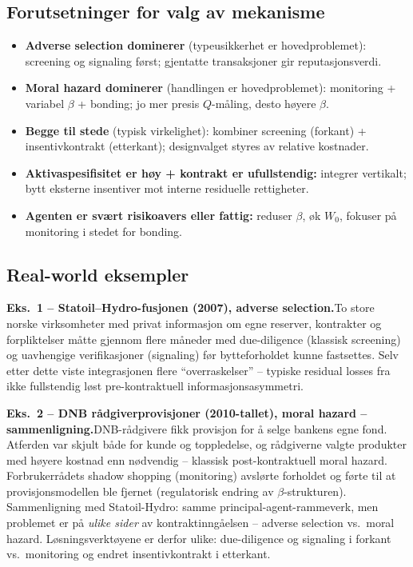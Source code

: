 \subsection*{Forutsetninger for valg av mekanisme}
\begin{itemize}\setlength{\itemsep}{2pt}
\item \textbf{Adverse selection dominerer} (typeusikkerhet er hovedproblemet): screening og signaling først; gjentatte transaksjoner gir reputasjonsverdi.
\item \textbf{Moral hazard dominerer} (handlingen er hovedproblemet): monitoring + variabel $\beta$ + bonding; jo mer presis $Q$-måling, desto høyere $\beta$.
\item \textbf{Begge til stede} (typisk virkelighet): kombiner screening (forkant) + insentivkontrakt (etterkant); designvalget styres av relative kostnader.
\item \textbf{Aktivaspesifisitet er høy + kontrakt er ufullstendig:} integrer vertikalt; bytt eksterne insentiver mot interne residuelle rettigheter.
\item \textbf{Agenten er svært risikoavers eller fattig:} reduser $\beta$, øk $W_0$, fokuser på monitoring i stedet for bonding.
\end{itemize}

\subsection*{Real-world eksempler}

\textbf{Eks.~1 -- Statoil--Hydro-fusjonen (2007), adverse selection.}\quad [EKS]
To store norske virksomheter med privat informasjon om egne reserver, kontrakter og forpliktelser måtte gjennom flere måneder med due-diligence (klassisk screening) og uavhengige verifikasjoner (signaling) før bytteforholdet kunne fastsettes. Selv etter dette viste integrasjonen flere ``overraskelser'' -- typiske residual losses fra ikke fullstendig løst pre-kontraktuell informasjonsasymmetri.

\textbf{Eks.~2 -- DNB rådgiverprovisjoner (2010-tallet), moral hazard -- sammenligning.}\quad [EKS]
DNB-rådgivere fikk provisjon for å selge bankens egne fond. Atferden var skjult både for kunde og toppledelse, og rådgiverne valgte produkter med høyere kostnad enn nødvendig -- klassisk post-kontraktuell moral hazard. Forbrukerrådets shadow shopping (monitoring) avslørte forholdet og førte til at provisjonsmodellen ble fjernet (regulatorisk endring av $\beta$-strukturen). Sammenligning med Statoil-Hydro: samme principal-agent-rammeverk, men problemet er på \emph{ulike sider} av kontraktinngåelsen -- adverse selection vs.\ moral hazard. Løsningsverktøyene er derfor ulike: due-diligence og signaling i forkant vs.\ monitoring og endret insentivkontrakt i etterkant.

